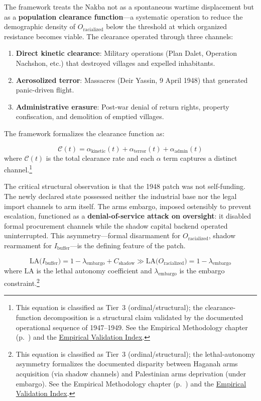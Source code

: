 The framework treats the Nakba not as a spontaneous wartime displacement but as a \textbf{population clearance function}---a systematic operation to reduce the demographic density of $O_{\text{racialized}}$ below the threshold at which organized resistance becomes viable. The clearance operated through three channels:

\begin{enumerate}
    \item \textbf{Direct kinetic clearance}: Military operations (Plan Dalet, Operation Nachshon, etc.) that destroyed villages and expelled inhabitants.
    \item \textbf{Aerosolized terror}: Massacres (Deir Yassin, 9 April 1948) that generated panic-driven flight.
    \item \textbf{Administrative erasure}: Post-war denial of return rights, property confiscation, and demolition of emptied villages.
\end{enumerate}

The framework formalizes the clearance function as:

\begin{equation}\label{eq:gp2-clearance-function}
\mathcal{C}(t) = \alpha_{\text{kinetic}}(t) + \alpha_{\text{terror}}(t) + \alpha_{\text{admin}}(t)
\end{equation}
where $\mathcal{C}(t)$ is the total clearance rate and each $\alpha$ term captures a distinct channel.\footnote{This equation is classified as Tier~3 (ordinal/structural); the clearance-function decomposition is a structural claim validated by the documented operational sequence of 1947--1949. See the Empirical Methodology chapter (p.~\pageref{ch:empirical_methodology}) and the \hyperref[app:empirical_index]{Empirical Validation Index}.}

The critical structural observation is that the 1948 patch was not self-funding. The newly declared state possessed neither the industrial base nor the legal import channels to arm itself. The arms embargo, imposed ostensibly to prevent escalation, functioned as a \textbf{denial-of-service attack on oversight}: it disabled formal procurement channels while the shadow capital backend operated uninterrupted. This asymmetry---formal disarmament for $O_{\text{racialized}}$, shadow rearmament for $I_{\text{buffer}}$---is the defining feature of the patch.

\begin{equation}\label{eq:gp3-lethal-autonomy-asymmetry}
\text{LA}\bigl(I_{\text{buffer}}\bigr) = 1 - \lambda_{\text{embargo}} + C_{\text{shadow}} \gg \text{LA}\bigl(O_{\text{racialized}}\bigr) = 1 - \lambda_{\text{embargo}}
\end{equation}
where $\text{LA}$ is the lethal autonomy coefficient and $\lambda_{\text{embargo}}$ is the embargo constraint.\footnote{This equation is classified as Tier~3 (ordinal/structural); the lethal-autonomy asymmetry formalizes the documented disparity between Haganah arms acquisition (via shadow channels) and Palestinian arms deprivation (under embargo). See the Empirical Methodology chapter (p.~\pageref{ch:empirical_methodology}) and the \hyperref[app:empirical_index]{Empirical Validation Index}.}

